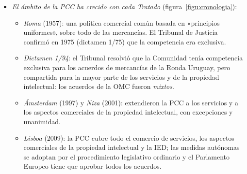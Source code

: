 \documentclass[11pt]{article}
\begin{document}
\begin{itemize}
\item \emph{El ámbito de la PCC ha crecido con cada Tratado} (figura~\ref{figu:cronologia}):
  \begin{itemize}
  \item \emph{Roma} (1957): una política comercial común basada en «principios uniformes», sobre todo de las mercancías. El Tribunal de Justicia confirmó en 1975 (dictamen 1/75) que la competencia era exclusiva.
  \item \emph{Dictamen 1/94}: el Tribunal resolvió que la Comunidad tenía competencia exclusiva para los acuerdos de mercancías de la Ronda Uruguay, pero compartida para la mayor parte de los servicios y de la propiedad intelectual: los acuerdos de la OMC fueron \emph{mixtos}.
  \item \emph{Ámsterdam} (1997) y \emph{Niza} (2001): extendieron la PCC a los servicios y a los aspectos comerciales de la propiedad intelectual, con excepciones y unanimidad.
  \item \emph{Lisboa} (2009): la PCC cubre todo el comercio de servicios, los aspectos comerciales de la propiedad intelectual y la IED; las medidas autónomas se adoptan por el procedimiento legislativo ordinario y el Parlamento Europeo tiene que aprobar todos los acuerdos.
  \end{itemize}
\end{itemize}

\begin{infografia}[H]
\centering
\caption{La política comercial común, 1957-2026}\label{figu:cronologia}
\end{infografia}
\end{document}
